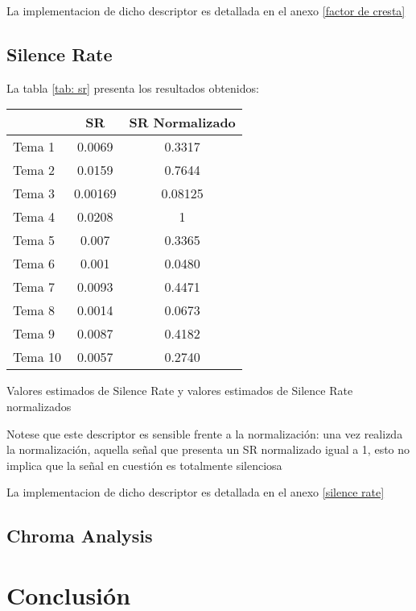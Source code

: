 \documentclass[]{article}
\makeatletter
\newcommand{\tabla}[4]{
\begin{tablehere}
\begin{center}
\begin{tabular}{#1}
#2
\end{tabular}
\caption{#3}
\label{#4}
\end{center}
\end{tablehere}
}
\newenvironment{tablehere}    %
  {\def\@captype{table}}    %

  {}              %
\makeatother
\begin{document}
\begin{multicols}{2}
La implementacion de dicho descriptor es detallada en el anexo \ref{factor de cresta}

\subsection{Silence Rate}
La tabla \ref{tab: sr} presenta los resultados obtenidos:
\vspace{0.3 cm}
\tabla
{|l|c|c|}
{
\hline
& SR	& SR Normalizado \\
\hline
Tema 1 &	0.0069 &	0.3317 \\
\hline
Tema 2	& 0.0159	& 0.7644 \\
\hline
Tema 3 &	0.00169 &	0.08125 \\
\hline
Tema 4 &	 0.0208	&  1 \\
\hline
Tema 5	&  0.007  &	0.3365 \\
\hline
Tema 6  &	0.001	 & 0.0480 \\
\hline
Tema 7	&  0.0093	 & 0.4471 \\
\hline
Tema 8  &	0.0014  &	0.0673 \\
\hline
Tema 9	&  0.0087 &	0.4182 \\
\hline
Tema 10	&  0.0057 &	0.2740 \\
\hline
}
{Valores estimados de Silence Rate y valores estimados de Silence Rate normalizados}
{tab: sr}

Notese que este descriptor es sensible frente a la normalización:
una vez realizda la normalización, aquella señal que presenta un SR
normalizado igual a 1, esto no implica que la señal en cuestión es totalmente silenciosa

La implementacion de dicho descriptor es detallada en el anexo \ref{silence rate}

\subsection{Chroma Analysis}




\section{Conclusión}
\printbibliography
\end{multicols}

\newpage
\end{document}
